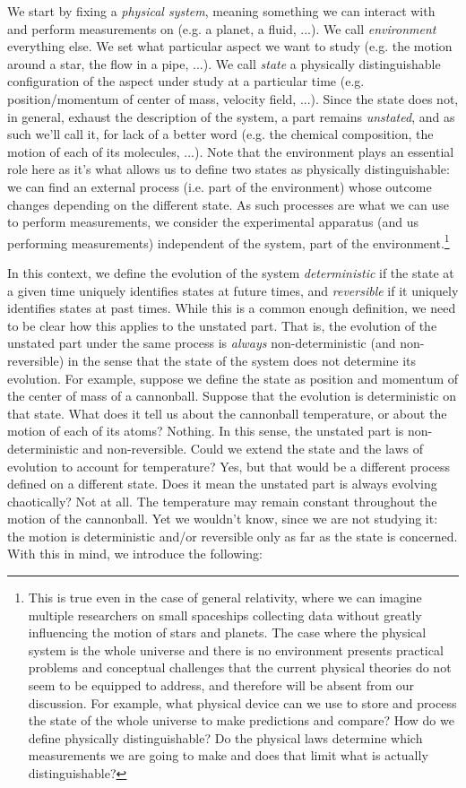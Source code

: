 \documentclass[aps,pra,10pt,twocolumn,floatfix,nofootinbib]{revtex4-1}
\theoremstyle{definition}
\begin{document}
We start by fixing a \emph{physical system}, meaning something we can interact with and perform measurements on (e.g. a planet, a fluid, ...). We call \emph{environment} everything else. We set what particular aspect we want to study (e.g. the motion around a star, the flow in a pipe, ...). We call \emph{state} a physically distinguishable configuration of the aspect under study at a particular time (e.g. position/momentum of center of mass, velocity field, ...). Since the state does not, in general, exhaust the description of the system, a part remains \emph{unstated}, and as such we'll call it, for lack of a better word (e.g. the chemical composition, the motion of each of its molecules, ...). Note that the environment plays an essential role here as it's what allows us to define two states as physically distinguishable: we can find an external process (i.e. part of the environment) whose outcome changes depending on the different state. As such processes are what we can use to perform measurements, we consider the experimental apparatus (and us performing measurements) independent of the system, part of the environment.\footnote{This is true even in the case of general relativity, where we can imagine multiple researchers on small spaceships collecting data without greatly influencing the motion of stars and planets. The case where the physical system is the whole universe and there is no environment presents practical problems  and conceptual challenges that the current physical theories do not seem to be equipped to address, and therefore will be absent from our discussion. For example, what physical device can we use to store and process the state of the whole universe to make predictions and compare? How do we define physically distinguishable? Do the physical laws determine which measurements we are going to make and does that limit what is actually distinguishable?}
 
In this context, we define the evolution of the system \emph{deterministic} if the state at a given time uniquely identifies states at future times, and \emph{reversible} if it uniquely identifies states at past times. While this is a common enough definition, we need to be clear how this applies to the unstated part. That is, the evolution of the unstated part under the same process is \emph{always} non-deterministic (and non-reversible) in the sense that the state of the system does not determine its evolution. For example, suppose we define the state as position and momentum of the center of mass of a cannonball. Suppose that the evolution is deterministic on that state. What does it tell us about the cannonball temperature, or about the motion of each of its atoms? Nothing. In this sense, the unstated part is non-deterministic and non-reversible. Could we extend the state and the laws of evolution to account for temperature? Yes, but that would be a different process defined on a different state. Does it mean the unstated part is always evolving chaotically? Not at all. The temperature may remain constant throughout the motion of the cannonball. Yet we wouldn't know, since we are not studying it: the motion is deterministic and/or reversible only as far as the state is concerned. With this in mind, we introduce the following:
\end{document}
